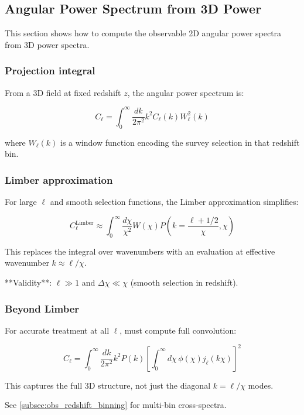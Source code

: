 \subsection{Angular Power Spectrum from 3D Power}\label{subsec:obs_angular_ps}

This section shows how to compute the observable 2D angular power spectra from 3D power spectra.

\subsubsection{Projection integral}

From a 3D field at fixed redshift $z$, the angular power spectrum is:

\begin{equation}
C_\ell = \int_0^\infty \frac{dk}{2\pi^2} k^2 C_\ell(k) W^2_\ell(k)
\end{equation}

where $W_\ell(k)$ is a window function encoding the survey selection in that redshift bin.

\subsubsection{Limber approximation}

For large $\ell$ and smooth selection functions, the Limber approximation simplifies:

\begin{equation}
C_\ell^{\text{Limber}} \approx \int_0^\infty \frac{d\chi}{\chi^2} W(\chi) P\left(k = \frac{\ell + 1/2}{\chi}, \chi\right)
\end{equation}

This replaces the integral over wavenumbers with an evaluation at effective wavenumber $k \approx \ell/\chi$.

**Validity**: $\ell \gg 1$ and $\Delta\chi \ll \chi$ (smooth selection in redshift).

\subsubsection{Beyond Limber}

For accurate treatment at all $\ell$, must compute full convolution:

\begin{equation}
C_\ell = \int_0^\infty \frac{dk}{2\pi^2} k^2 P(k) \left[\int_0^\infty d\chi \, \phi(\chi) j_\ell(k\chi)\right]^2
\end{equation}

This captures the full 3D structure, not just the diagonal $k = \ell/\chi$ modes.

See \cref{subsec:obs_redshift_binning} for multi-bin cross-spectra.
